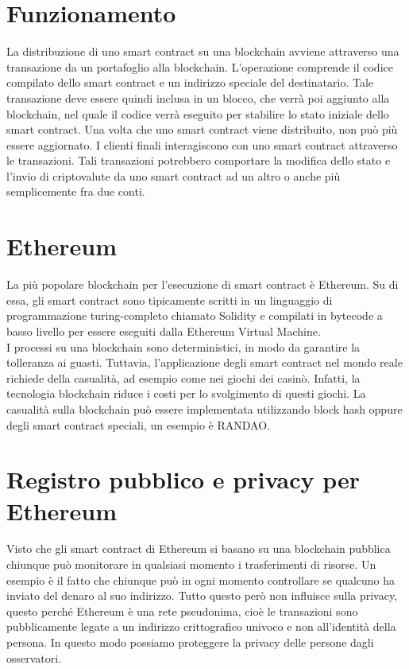\documentclass[a4paper,11pt]{report}
\begin{document}
\section{Funzionamento}
La distribuzione di uno smart contract su una blockchain avviene attraverso una transazione da un portafoglio alla blockchain. L'operazione comprende il codice compilato dello smart contract e un indirizzo speciale del destinatario. Tale transazione deve essere quindi inclusa in un blocco, che verrà poi aggiunto alla blockchain, nel quale il codice verrà eseguito per stabilire lo stato iniziale dello smart contract. Una volta che uno smart contract viene distribuito, non può più essere aggiornato. I clienti finali interagiscono con uno smart contract attraverso le transazioni. Tali transazioni potrebbero comportare la modifica dello stato e l'invio di criptovalute da uno smart contract ad un altro o anche più semplicemente fra due conti.

\section{Ethereum}
La più popolare blockchain per l'esecuzione di smart contract è Ethereum. Su di essa, gli smart contract sono tipicamente scritti in un linguaggio di programmazione turing-completo chiamato Solidity e compilati in bytecode a basso livello per essere eseguiti dalla Ethereum Virtual Machine.\\
I processi su una blockchain sono deterministici, in modo da garantire la tolleranza ai guasti. Tuttavia, l'applicazione degli smart contract nel mondo reale richiede della casualità, ad esempio come nei giochi dei casinò. Infatti, la tecnologia blockchain riduce i costi per lo svolgimento di questi giochi. La casualità sulla blockchain può essere implementata utilizzando block hash oppure degli smart contract speciali, un esempio è RANDAO.

\section{Registro pubblico e privacy per Ethereum}
Visto che gli smart contract di Ethereum si basano su una blockchain pubblica chiunque può monitorare in qualsiasi momento i trasferimenti di risorse. Un esempio è il fatto che chiunque può in ogni momento controllare se qualcuno ha inviato del denaro al suo indirizzo. Tutto questo però non influisce sulla privacy, questo perché Ethereum è una rete pseudonima, cioè le transazioni sono pubblicamente legate a un indirizzo crittografico univoco e non all'identità della persona. In questo modo possiamo proteggere la privacy delle persone dagli osservatori.
\end{document}

